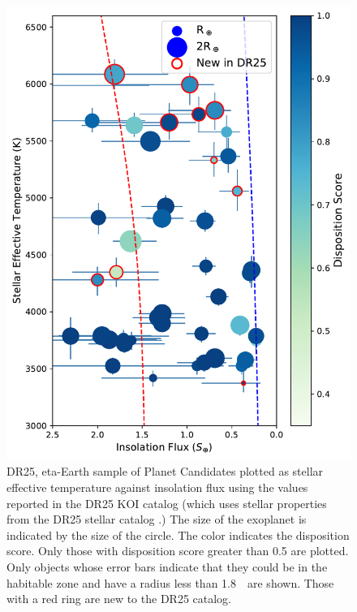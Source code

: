 \begin{figure}[htb]
    \centering
    \includegraphics[width=\linewidth]{f14.pdf}
    \caption{DR25, eta-Earth sample of Planet Candidates plotted as stellar effective temperature against insolation flux using the values reported in the DR25 KOI catalog (which uses stellar properties from the DR25 stellar catalog \citep{Mathur2017ApJS}.) The size of the exoplanet is indicated by the size of the circle.  The color indicates the disposition score. Only those with disposition score greater than 0.5 are plotted.  Only objects whose error bars indicate that they could be in the habitable zone and have a radius less than 1.8~\re\ are shown. Those with a red ring are new to the DR25 catalog. }
    \label{f:hzPlot}
\end{figure}


